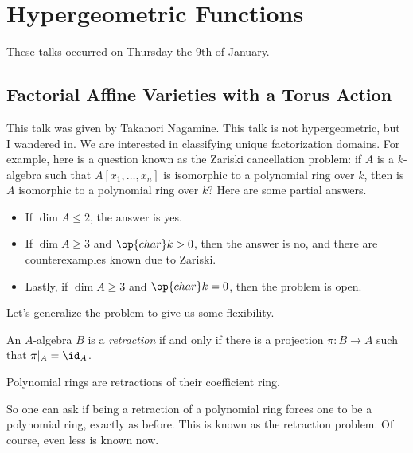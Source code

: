 \documentclass{article}
\begin{document}
\section{Hypergeometric Functions}
These talks occurred on Thursday the 9th of January.

\subsection{Factorial Affine Varieties with a Torus Action}
This talk was given by Takanori Nagamine. This talk is not hypergeometric, but I wandered in. We are interested in classifying unique factorization domains. For example, here is a question known as the Zariski cancellation problem: if $A$ is a $k$-algebra such that $A[x_1,\ldots,x_n]$ is isomorphic to a polynomial ring over $k$, then is $A$ isomorphic to a polynomial ring over $k$? Here are some partial answers.
\begin{itemize}
	\item If $\dim A\le2$, the answer is yes.
	\item If $\dim A\ge3$ and $\op{char}k>0$, then the answer is no, and there are counterexamples known due to Zariski.
	\item Lastly, if $\dim A\ge3$ and $\op{char}k=0$, then the problem is open.
\end{itemize}
Let's generalize the problem to give us some flexibility.
\begin{definition}[retract]
	An $A$-algebra $B$ is a \textit{retraction} if and only if there is a projection $\pi\colon B\to A$ such that $\pi|_A=\id_A$.
\end{definition}
\begin{example}
	Polynomial rings are retractions of their coefficient ring.
\end{example}
So one can ask if being a retraction of a polynomial ring forces one to be a polynomial ring, exactly as before. This is known as the retraction problem. Of course, even less is known now.
\end{document}
